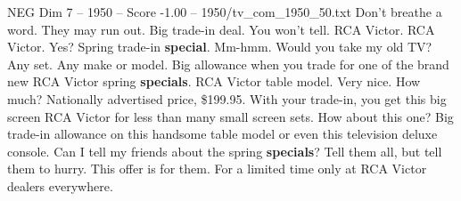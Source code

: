 \begin{textsample}{NEG Dim 7 – 1950 – Score -1.00 – 1950/tv\_com\_1950\_50.txt}  \label{ex:f7_neg_088}
Don't breathe a word.
They may run out.
Big trade-in deal.
You won't tell.
RCA Victor.
RCA Victor.
Yes?
Spring trade-in \textbf{special}.
Mm-hmm.
Would you take my old TV?
Any set.
Any make or model.
Big allowance when you trade for one of the brand new RCA Victor spring \textbf{specials}.
RCA Victor table model.
Very nice.
How much?
Nationally advertised price, \$199.95.
With your trade-in, you get this big screen RCA Victor for less than many small screen sets.
How about this one?
Big trade-in allowance on this handsome table model or even this television deluxe console.
Can I tell my friends about the spring \textbf{specials}?
Tell them all, but tell them to hurry.
This offer is for them.
For a limited time only at RCA Victor dealers everywhere.

\end{textsample}
